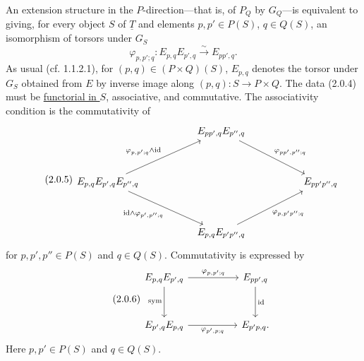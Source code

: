An extension structure in the $P$-direction---that is, of $P_Q$ by
$G_Q$---is equivalent to giving, for every object $S$ of $\underline T$
and elements $p,p'\in P(S)$, $q\in Q(S)$, an isomorphism of torsors
under $G_S$
\begin{equation}\tag{2.0.4}
 \varphi_{p,p';q}:E_{p,q}E_{p',q}
 \xrightarrow{\ \sim\ }E_{pp',q}.
\end{equation}
As usual (cf. 1.1.2.1), for $(p,q)\in(P\times Q)(S)$, $E_{p,q}$ denotes
the torsor under $G_S$ obtained from $E$ by inverse image along
$(p,q):S\longrightarrow P\times Q$. The data (2.0.4) must be
\underline{functorial in $S$}, associative, and commutative. The
associativity condition is the commutativity of
\begin{equation}\tag{2.0.5}
\begin{tikzcd}[column sep=5.1em,row sep=3.4em]
 & E_{pp',q}E_{p'',q}
   \arrow[rd,"{\varphi_{pp',p'';q}}"] & \\
 E_{p,q}E_{p',q}E_{p'',q}
   \arrow[ru,"{\varphi_{p,p';q}\wedge\mathrm{id}}"]
   \arrow[rd,"{\mathrm{id}\wedge\varphi_{p',p'';q}}"']
 && E_{pp'p'',q} \\
 & E_{p,q}E_{p'p'',q}
   \arrow[ru,"{\varphi_{p,p'p'';q}}"'] &
\end{tikzcd}
\end{equation}
for $p,p',p''\in P(S)$ and $q\in Q(S)$. Commutativity is expressed by
\begin{equation}\tag{2.0.6}
\begin{tikzcd}[column sep=5em,row sep=3.1em]
 E_{p,q}E_{p',q} \arrow[r,"{\varphi_{p,p';q}}"]
   \arrow[d,"\mathrm{sym}"']
 & E_{pp',q} \arrow[d,"\mathrm{id}"] \\
 E_{p',q}E_{p,q} \arrow[r,"{\varphi_{p',p;q}}"']
 & E_{p'p,q}.
\end{tikzcd}
\end{equation}
Here $p,p'\in P(S)$ and $q\in Q(S)$.

